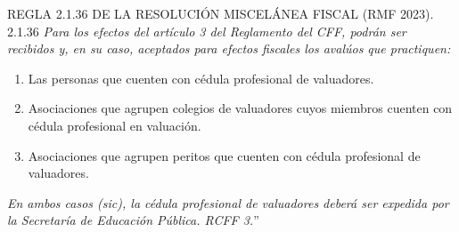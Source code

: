 

\textcolor{principal}{REGLA 2.1.36 DE LA RESOLUCI\'ON MISCEL\'ANEA FISCAL (RMF 2023).}\\


\textcolor{secundario}{2.1.36} \textit{Para los efectos del artículo 3 del Reglamento del CFF, podr\'an ser recibidos y, en su caso, aceptados para efectos fiscales los aval\'uos que practiquen:} \\

\begin{enumerate}[\indent I.]
\item Las personas que cuenten con c\'edula profesional de valuadores. 
\item Asociaciones que agrupen colegios de valuadores cuyos miembros cuenten con c\'edula profesional en valuaci\'on. 
\item Asociaciones que agrupen peritos que cuenten con c\'edula profesional de valuadores. 

\end{enumerate}


\textit{En ambos casos (sic), la c\'edula profesional de valuadores deber\'a ser expedida por la Secretar\'ia de Educaci\'on P\'ublica. RCFF 3.}''\\

